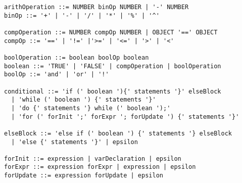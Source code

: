 \documentclass[letterpaper]{article}
\begin{document}
\begin{verbatim}
arithOperation ::= NUMBER binOp NUMBER | '-' NUMBER
binOp ::= '+' | '-' | '/' | '*' | '%' | '^'

compOperation ::= NUMBER compOp NUMBER | OBJECT '==' OBJECT
compOp ::= '==' | '!=' |'>=' | '<=' | '>' | '<'

boolOperation ::= boolean boolOp boolean
boolean ::= 'TRUE' | 'FALSE' | compOperation | boolOperation
boolOp ::= 'and' | 'or' | '!'

conditional ::= 'if (' boolean '){' statements '}' elseBlock 
  | 'while (' boolean ') {' statements '}' 
  | 'do {' statements '} while (' boolean ');' 
  | 'for (' forInit ';' forExpr '; forUpdate ') {' statements '}'

elseBlock ::= 'else if (' boolean ') {' statements '} elseBlock 
  | 'else {' statements '}' | epsilon

forInit ::= expression | varDeclaration | epsilon
forExpr ::= expression forExpr | expression | epsilon
forUpdate ::= expression forUpdate | epsilon

\end{verbatim}
\end{document}
